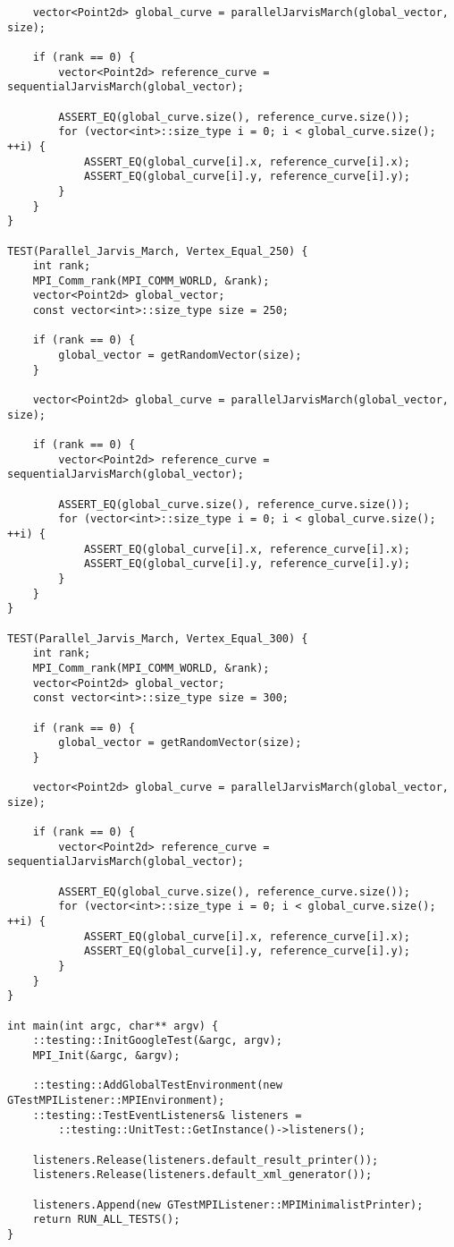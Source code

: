 \documentclass{report}
\begin{document}
\begin{lstlisting}
    vector<Point2d> global_curve = parallelJarvisMarch(global_vector, size);

    if (rank == 0) {
        vector<Point2d> reference_curve = sequentialJarvisMarch(global_vector);

        ASSERT_EQ(global_curve.size(), reference_curve.size());
        for (vector<int>::size_type i = 0; i < global_curve.size(); ++i) {
            ASSERT_EQ(global_curve[i].x, reference_curve[i].x);
            ASSERT_EQ(global_curve[i].y, reference_curve[i].y);
        }
    }
}

TEST(Parallel_Jarvis_March, Vertex_Equal_250) {
    int rank;
    MPI_Comm_rank(MPI_COMM_WORLD, &rank);
    vector<Point2d> global_vector;
    const vector<int>::size_type size = 250;

    if (rank == 0) {
        global_vector = getRandomVector(size);
    }

    vector<Point2d> global_curve = parallelJarvisMarch(global_vector, size);

    if (rank == 0) {
        vector<Point2d> reference_curve = sequentialJarvisMarch(global_vector);

        ASSERT_EQ(global_curve.size(), reference_curve.size());
        for (vector<int>::size_type i = 0; i < global_curve.size(); ++i) {
            ASSERT_EQ(global_curve[i].x, reference_curve[i].x);
            ASSERT_EQ(global_curve[i].y, reference_curve[i].y);
        }
    }
}

TEST(Parallel_Jarvis_March, Vertex_Equal_300) {
    int rank;
    MPI_Comm_rank(MPI_COMM_WORLD, &rank);
    vector<Point2d> global_vector;
    const vector<int>::size_type size = 300;

    if (rank == 0) {
        global_vector = getRandomVector(size);
    }

    vector<Point2d> global_curve = parallelJarvisMarch(global_vector, size);

    if (rank == 0) {
        vector<Point2d> reference_curve = sequentialJarvisMarch(global_vector);

        ASSERT_EQ(global_curve.size(), reference_curve.size());
        for (vector<int>::size_type i = 0; i < global_curve.size(); ++i) {
            ASSERT_EQ(global_curve[i].x, reference_curve[i].x);
            ASSERT_EQ(global_curve[i].y, reference_curve[i].y);
        }
    }
}

int main(int argc, char** argv) {
    ::testing::InitGoogleTest(&argc, argv);
    MPI_Init(&argc, &argv);

    ::testing::AddGlobalTestEnvironment(new GTestMPIListener::MPIEnvironment);
    ::testing::TestEventListeners& listeners =
        ::testing::UnitTest::GetInstance()->listeners();

    listeners.Release(listeners.default_result_printer());
    listeners.Release(listeners.default_xml_generator());

    listeners.Append(new GTestMPIListener::MPIMinimalistPrinter);
    return RUN_ALL_TESTS();
}
\end{lstlisting}
\end{document}
